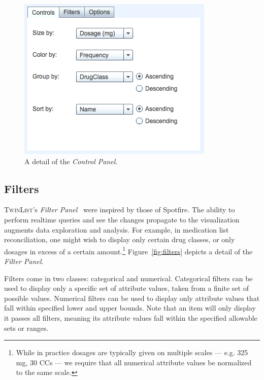 \documentclass{chi2009}
\newcommand{\TwinList}{\textsc{TwinList}}
\newcommand{\Controls}{\textit{Control Panel}}
\newcommand{\Filters}{\textit{Filter Panel}}
\begin{document}
\begin{figure}[t]
\begin{center}
\includegraphics[width=1\linewidth]{img/controls.png}
\end{center}
   \caption{A detail of the \Controls.}
   \label{fig:controls}
\end{figure}

\subsection{Filters}
\TwinList's \Filters~ were inspired by those of Spotfire\cite{Ahlberg1996}. The ability to perform realtime queries and see the changes propagate to the visualization augments data exploration and analysis. For example, in medication list reconciliation, one might wish to display only certain drug classes, or only dosages in excess of a certain amount.\footnote{While in practice dosages are typically given on multiple scales --- e.g. 325 mg, 30 CCs --- we require that all numerical attribute values be normalized to the same scale.} Figure~\ref{fig:filters} depicts a detail of the \Filters.

Filters come in two classes: categorical and numerical. Categorical filters can be used to display only a specific set of attribute values, taken from a finite set of possible values. Numerical filters can be used to display only attribute values that fall within specified lower and upper bounds. Note that an item will only display it passes all filters, meaning its attribute values fall within the specified allowable sets or ranges.
\end{document}
